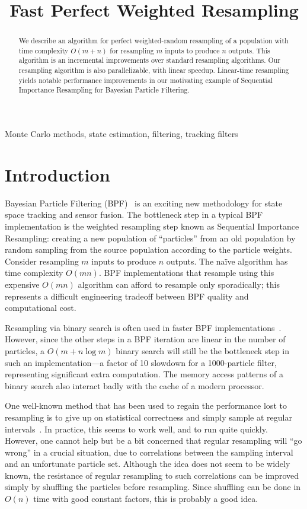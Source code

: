 \documentclass{article}
\title{Fast Perfect Weighted Resampling}
\begin{document}
\maketitle
%
\begin{abstract}
  We describe an algorithm for perfect weighted-random
  resampling of a population with time complexity $O(m +
  n)$ for resampling $m$ inputs to produce $n$ outputs.
  This algorithm is an incremental improvements over
  standard resampling algorithms.  Our resampling
  algorithm is also parallelizable, with linear speedup.
  Linear-time resampling yields notable performance
  improvements in our motivating example of Sequential
  Importance Resampling for Bayesian
  Particle Filtering.
\end{abstract}
%
\begin{keywords}
Monte Carlo methods, state estimation, filtering, tracking filters
\end{keywords}
%
\section{Introduction}

  Bayesian Particle Filtering (BPF)~\cite{bpf} is an exciting
  new methodology for state space tracking and sensor
  fusion.  The bottleneck step in a typical BPF
  implementation is the weighted resampling step known as
  Sequential Importance Resampling: creating a new
  population of ``particles'' from an old population by
  random sampling from the source population according to
  the particle weights.  Consider resampling $m$ inputs to
  produce $n$ outputs.  The na\"ive algorithm has time
  complexity $O(mn)$.  BPF implementations that resample
  using this expensive $O(mn)$ algorithm can afford to
  resample only sporadically; this represents a difficult
  engineering tradeoff between BPF quality and computational
  cost.

  Resampling via binary search is often used in faster BPF
  implementations~\cite{arulampalam02tutorial}.  However,
  since the other steps in a BPF iteration are linear in the
  number of particles, a $O(m + n \log m)$ binary search
  will still be the bottleneck step in such an
  implementation---a factor of 10 slowdown for a 1000-particle
  filter, representing significant extra computation.  The
  memory access patterns of a binary search also interact
  badly with the cache of a modern processor.

  One well-known method that has been used to regain the
  performance lost to resampling is to give up on
  statistical correctness and simply sample at regular
  intervals~\cite{kitagawa}.  In practice, this seems to
  work well, and to run quite quickly.  However, one cannot
  help but be a bit concerned that regular resampling will
  ``go wrong'' in a crucial situation, due to correlations
  between the sampling interval and an unfortunate particle
  set.  Although the idea does not seem to be widely known,
  the resistance of regular resampling to such correlations
  can be improved simply by shuffling the particles before
  resampling.  Since shuffling can be done in $O(n)$ time
  with good constant factors, this is probably a good idea.
\end{document}

